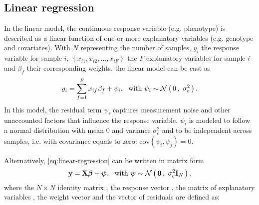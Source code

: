 \subsection{Linear regression}
In the linear model, the continuous response variable (e.g. phenotype) is described as a linear function of one or more explanatory variables (e.g. genotype and covariates). With \(N\) representing the number of samples, \(y_i\) the response variable for sample \(i\), \(\left\{x_{i1}, x_{i2}, \dots, x_{iF}\right\}\)  the \(F\) explanatory variables for sample \(i\) and \(\beta_{f}\) their corresponding weights, the linear model can be cast as
\begin{equation}
y_i = \sum^{F}_{f=1}x_{if}\beta_{f} + \psi_i, \,\,\,\, \text{with }  \psi_i \sim \mathcal{N}\left(\,{0}\,,~{\sigma^2_e}\,\right).
\label{eq:linear-regression}
\end{equation}
%
In this model, the residual term \(\psi_i\) captures measurement noise and other unaccounted factors that influence the response variable. \(\psi_i\) is modeled to follow a normal distribution with mean 0 and variance \(\sigma^2_e\) and to be independent across 
samples, i.e. with covariance equals to zero: \(\text{cov}\left(\psi_i,\psi_j\right)=0\).

Alternatively, \cref{eq:linear-regression} can be written in matrix form
\begin{equation}
\boldsymbol{\mathbf{y}} = \boldsymbol{\mathbf{X}}\boldsymbol{\mathbf{\beta}} + \boldsymbol{\mathbf{\psi}}, \,\,\,\, \text{with }  \boldsymbol{\mathbf{\psi}} \sim  \mathcal{N}\left(\,{\boldsymbol{\mathbf{0}}}\,,~{\sigma^2_e\boldsymbol{\mathbf{I}}_{N}}\,\right),
\label{eq:linear-regression-matrix}
\end{equation}
%
where the \(N \times N\) identity matrix , the response vector , the matrix of explanatory variables , the weight vector \tmat{\beta} and the vector of residuals \tmat{\psi} are defined as:

